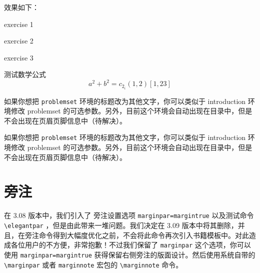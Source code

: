 \documentclass[lang=cn,10pt]{elegantbook}
\begin{document}
效果如下：
\begin{problemset}
  \item exercise 1
  \item exercise 2
  \item exercise 3
  \item 测试数学公式
  \begin{equation}
    a^2+b^2=c_{2_{i}} (1,2) [1,23]
  \end{equation}
\end{problemset}

\begin{remark}
如果你想把 \lstinline{problemset} 环境的标题改为其他文字，你可以类似于 introduction 环境修改 problemset 的可选参数。另外，目前这个环境会自动出现在目录中，但是不会出现在页眉页脚信息中（待解决）。
\end{remark}

\begin{solution}
如果你想把 \lstinline{problemset} 环境的标题改为其他文字，你可以类似于 introduction 环境修改 problemset 的可选参数。另外，目前这个环境会自动出现在目录中，但是不会出现在页眉页脚信息中（待解决）。
\end{solution}

\section{旁注}

在 3.08 版本中，我们引入了 旁注设置选项 \lstinline{marginpar=margintrue} 以及测试命令 \lstinline{\elegantpar} ，但是由此带来一堆问题。我们决定在 3.09 版本中将其删除，并且，在旁注命令得到大幅度优化之前，不会将此命令再次引入书籍模板中。对此造成各位用户的不方便，非常抱歉！不过我们保留了 \lstinline{marginpar} 这个选项，你可以使用 \lstinline{marginpar=margintrue} 获得保留右侧旁注的版面设计。然后使用系统自带的 \lstinline{\marginpar} 或者 \lstinline{marginnote} 宏包的 \lstinline{\marginnote} 命令。
\end{document}
